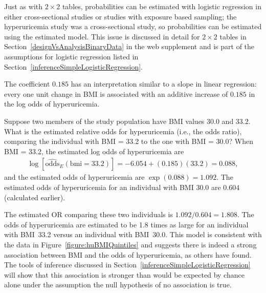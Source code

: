 Just as with $2 \times 2$ tables, probabilities can be estimated with logistic regression in either cross-sectional studies or studies with exposure based sampling; the hyperuricemia study was a cross-sectional study, so probabilities can be estimated using the estimated model. This issue is discussed in detail for $2 \times 2$ tables in Section~\ref{designVsAnalysisBinaryData} in the web supplement and is part of the assumptions for logistic regression listed in Section~\ref{inferenceSimpleLogisticRegression}.

The coefficient $0.185$ has an interpretation similar to a slope in linear regression: every one unit change in BMI is associated with an additive increase of $0.185$ in the log odds of hyperuricemia.

\begin{examplewrap}
\begin{nexample}{Suppose two members of the study population have BMI values $30.0$ and $33.2$. What is the estimated relative odds for hyperuricemia (i.e., the odds ratio), comparing the individual with BMI = 33.2 to the one with BMI = 30.0?}\label{example:ORHyperuricemia33v30}
When BMI = 33.2, the estimated log odds of hyperuricemia are
\begin{align*}
  \log[\widehat{\text{odds}}_E(\text{bmi} = 33.2)] = -6.054 + (0.185)(33.2) = 0.088,
\end{align*}
and the estimated odds of hyperuricemia are $\exp(0.088) = 1.092$. The estimated odds of hyperuricemia for an individual with BMI $30.0$ are $0.604$ (calculated earlier).

The estimated OR comparing these two individuals is $1.092/0.604 = 1.808$.  The odds of hyperuricemia are estimated to be 1.8 times as large for an individual with BMI~33.2 versus an individual with BMI~30.0.  This model is consistent with the data in Figure~\ref{figure:huBMIQuintiles} and suggests there is indeed a strong association between BMI and the odds of hyperuricemia, as others have found.  The tools of inference discussed in Section~\ref{inferenceSimpleLogisticRegression} will show that this association is stronger than would be expected by chance alone under the assumption the null hypothesis of no association is true.
  \end{nexample}
\end{examplewrap}

